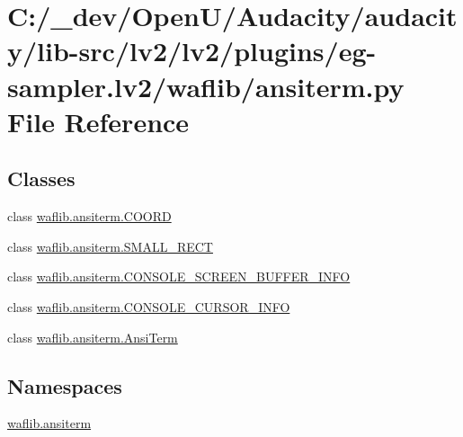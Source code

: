 \hypertarget{lv2_2plugins_2eg-sampler_8lv2_2waflib_2ansiterm_8py}{}\section{C\+:/\+\_\+dev/\+Open\+U/\+Audacity/audacity/lib-\/src/lv2/lv2/plugins/eg-\/sampler.lv2/waflib/ansiterm.py File Reference}
\label{lv2_2plugins_2eg-sampler_8lv2_2waflib_2ansiterm_8py}
\subsection*{Classes}
\begin{DoxyCompactItemize}
\item 
class \hyperlink{classwaflib_1_1ansiterm_1_1_c_o_o_r_d}{waflib.\+ansiterm.\+C\+O\+O\+RD}
\item 
class \hyperlink{classwaflib_1_1ansiterm_1_1_s_m_a_l_l___r_e_c_t}{waflib.\+ansiterm.\+S\+M\+A\+L\+L\+\_\+\+R\+E\+CT}
\item 
class \hyperlink{classwaflib_1_1ansiterm_1_1_c_o_n_s_o_l_e___s_c_r_e_e_n___b_u_f_f_e_r___i_n_f_o}{waflib.\+ansiterm.\+C\+O\+N\+S\+O\+L\+E\+\_\+\+S\+C\+R\+E\+E\+N\+\_\+\+B\+U\+F\+F\+E\+R\+\_\+\+I\+N\+FO}
\item 
class \hyperlink{classwaflib_1_1ansiterm_1_1_c_o_n_s_o_l_e___c_u_r_s_o_r___i_n_f_o}{waflib.\+ansiterm.\+C\+O\+N\+S\+O\+L\+E\+\_\+\+C\+U\+R\+S\+O\+R\+\_\+\+I\+N\+FO}
\item 
class \hyperlink{classwaflib_1_1ansiterm_1_1_ansi_term}{waflib.\+ansiterm.\+Ansi\+Term}
\end{DoxyCompactItemize}
\subsection*{Namespaces}
\begin{DoxyCompactItemize}
\item 
 \hyperlink{namespacewaflib_1_1ansiterm}{waflib.\+ansiterm}
\end{DoxyCompactItemize}
